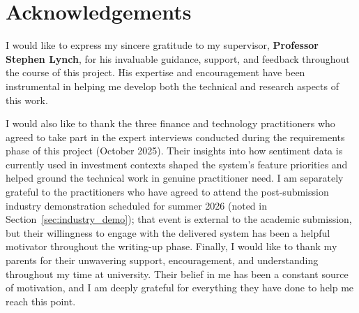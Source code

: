 \chapter*{Acknowledgements}

I would like to express my sincere gratitude to my supervisor, \textbf{Professor Stephen Lynch}, for his invaluable guidance, support, and feedback throughout the course of this project. His expertise and encouragement have been instrumental in helping me develop both the technical and research aspects of this work.

I would also like to thank the three finance and technology practitioners who agreed to take part in the expert interviews conducted during the requirements phase of this project (October 2025). Their insights into how sentiment data is currently used in investment contexts shaped the system's feature priorities and helped ground the technical work in genuine practitioner need. I am separately grateful to the practitioners who have agreed to attend the post-submission industry demonstration scheduled for summer 2026 (noted in Section~\ref{sec:industry_demo}); that event is external to the academic submission, but their willingness to engage with the delivered system has been a helpful motivator throughout the writing-up phase.
Finally, I would like to thank my parents for their unwavering support, encouragement, and understanding throughout my time at university. Their belief in me has been a constant source of motivation, and I am deeply grateful for everything they have done to help me reach this point.
